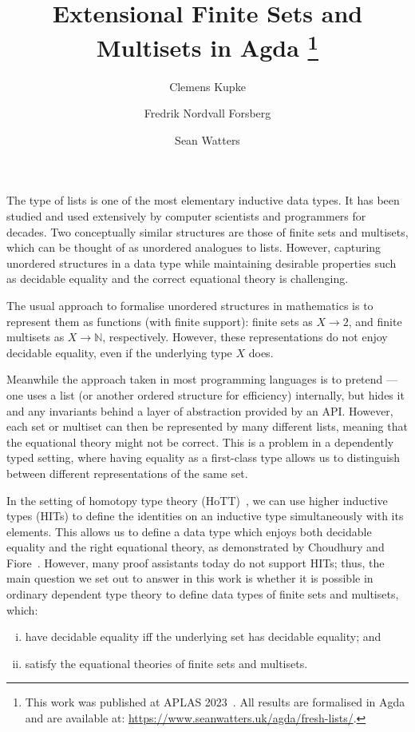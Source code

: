 \documentclass[a4paper]{easychair}
\title{Extensional Finite Sets and Multisets in Agda
\footnote{
This work was published at APLAS 2023~\cite{freshlists}.
All results are formalised in Agda and are available at:
\url{https://www.seanwatters.uk/agda/fresh-lists/}.
}}
\author{
Clemens Kupke
\and
Fredrik Nordvall Forsberg
\and
Sean Watters
}
\institute{
  University of Strathclyde, UK\\
  \email{\{clemens.kupke, fredrik.nordvall-forsberg, sean.watters\}@strath.ac.uk}
 }
\begin{document}
\maketitle



The type of lists is one of the most elementary inductive data types.
It has been studied and used extensively by computer scientists and programmers for decades.
Two conceptually similar structures are those of finite sets and multisets, which can be thought of as unordered analogues to lists.
However, capturing unordered structures in a data type while maintaining desirable properties such as decidable equality and the correct equational theory is challenging.

The usual approach to formalise unordered structures in mathematics
is to represent them as functions (with finite support): finite sets as $X \to 2$, and finite multisets as $X \to \mathbb{N}$, respectively.
However, these representations do not enjoy decidable equality, even if the underlying type $X$ does.

Meanwhile the approach taken in most programming languages is to pretend --- one uses a list (or another ordered structure for efficiency) internally, but hides it and any invariants behind a layer of abstraction provided by an API.
However, each set or multiset can then be represented by many different lists,
meaning that the equational theory might not be correct. This is a problem
in a dependently typed setting, where
having equality as a first-class type allows us to
distinguish between different representations of the same set.


In the setting of homotopy type theory (HoTT)~\cite{hottbook}, we can use higher inductive types (HITs) to define the identities on an inductive type simultaneously with its elements.
This allows us to define a data type which enjoys both decidable equality and the right equational theory, as demonstrated by Choudhury and Fiore~\cite{choudhuryfiore2023freecommmon}.
However, many proof assistants today do not support HITs;
thus, the main question we set out to answer in this work is
whether it is possible in ordinary dependent type theory
to define data types of finite sets and multisets, which:
\begin{enumerate}[(i)]
  \item have decidable equality iff the underlying set has decidable equality; and\label{item:success1}
  \item satisfy the equational theories of finite sets and multisets.\label{item:success2}
\end{enumerate}
\end{document}
